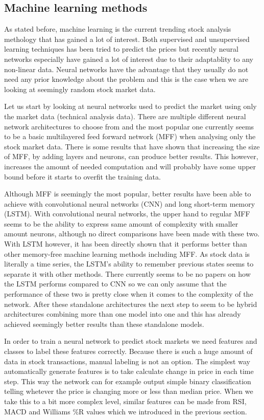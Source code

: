 \subsection{Machine learning methods}

As stated before, machine learning is the current trending stock analysis methology that has gained a lot of interest.
Both supervised and unsupervised learning techniques has been tried to predict the prices but recently neural networks especially have gained a lot of interest due to their adaptablity to any non-linear data.
Neural networks have the advantage that they usually do not need any prior knowledge about the problem and this is the case when we are looking at seemingly random stock market data.

Let us start by looking at neural networks used to predict the market using only the market data (technical analysis data).
There are multiple different neural network architectures to choose from and the most popular one currently seems to be a basic multilayered feed forward network (MFF) when analysing only the stock market data.
There is some results that have shown that increasing the size of MFF, by adding layers and neurons, can produce better results.
This however, increases the amount of needed computation and will probably have some upper bound before it starts to overfit the training data. \cite{senguptaa}

Although MFF is seemingly the most popular, better results have been able to achieve with convolutional neural networks (CNN) and long short-term memory (LSTM).
With convolutional neural networks, the upper hand to regular MFF seems to be the ability to express same amount of complexity with smaller amount neurons, although no direct comparisons have been made with these two.
With LSTM however, it has been directly shown that it performs better than other memory-free machine learning methods including MFF.
As stock data is literally a time series, the LSTM's ability to remember previous states seems to separate it with other methods.
There currently seems to be no papers on how the LSTM performs compared to CNN so we can only assume that the performance of these two is pretty close when it comes to the complexity of the network.
After these standalone architectures the next step to seem to be hybrid architectures combining more than one model into one and this has already achieved seemingly better results than these standalone models. \cite{senguptaa}

In order to train a neural network to predict stock markets we need features and classes to label these features correctly.
Because there is such a huge amount of data in stock transactions, manual labeling is not an option.
The simplest way automatically generate features is to take calculate change in price in each time step.
This way the network can for example output simple binary classification telling whetever the price is changing more or less than median price. \cite{fischer}
When we take this to a bit more complex level, similar features can be made from RSI, MACD and Williams \%R values which we introduced in the previous section. \cite{serez}

